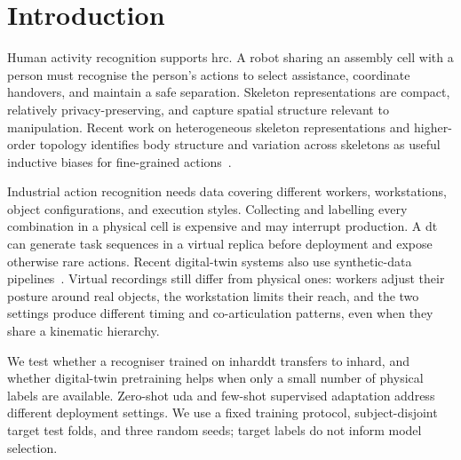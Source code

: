 \documentclass[3p,times,procedia]{elsarticle}
\begin{document}
\section{Introduction}
\label{sec:introduction}

Human activity recognition supports
\ac{hrc}. A robot sharing an assembly cell with a person must recognise the
person's actions to select assistance, coordinate handovers, and maintain a safe
separation. Skeleton representations are compact, relatively privacy-preserving,
and capture spatial structure relevant to manipulation. Recent work on
heterogeneous skeleton representations and higher-order topology identifies body
structure and variation across skeletons as useful inductive biases for
fine-grained actions~\cite{wang2025heterogeneous,chen2025hypergraph}.

Industrial action recognition needs data covering different workers,
workstations, object configurations, and execution styles. Collecting and
labelling every combination in a physical cell is expensive and may interrupt
production. A \ac{dt} can generate task sequences in a virtual replica before
deployment and expose otherwise rare actions. Recent digital-twin systems also
use synthetic-data pipelines~\cite{salierno2024syntheticdt}. Virtual recordings
still differ from physical ones: workers adjust their posture around real
objects, the workstation limits their reach, and the two settings produce
different timing and co-articulation patterns, even when they share a kinematic
hierarchy.

We test whether a recogniser trained on \acs{inharddt} transfers to \acs{inhard},
and whether digital-twin pretraining helps when only a small number of physical
labels are available. Zero-shot \ac{uda} and few-shot supervised adaptation
address different deployment settings. We use a fixed training protocol,
subject-disjoint target test folds, and three random seeds; target labels do not
inform model selection.
\end{document}
